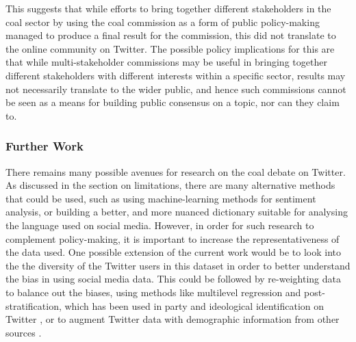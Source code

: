 \documentclass[12pt,onecolumn,twoside]{layout}
\begin{document}
This suggests that while efforts to bring together different stakeholders in the coal sector by using the coal commission as a form of public policy-making managed to produce a final result for the commission, this did not translate to the online community on Twitter. The possible policy implications for this are that while multi-stakeholder commissions may be useful in bringing together different stakeholders with different interests within a specific sector, results may not necessarily translate to the wider public, and hence such commissions cannot be seen as a means for building public consensus on a topic, nor can they claim to.

\subsubsection*{Further Work}
There remains many possible avenues for research on the coal debate on Twitter. As discussed in the section on limitations, there are many alternative methods that could be used, such as using machine-learning methods for sentiment analysis, or building a better, and more nuanced dictionary suitable for analysing the language used on social media. However, in order for such research to complement policy-making, it is important to increase the representativeness of the data used. One possible extension of the current work would be to look into the the diversity of the Twitter users in this dataset in order to better understand the bias in using social media data. This could be followed by re-weighting data to balance out the biases, using methods like multilevel regression and post-stratification, which has been used in party and ideological identification on Twitter \citep{Barbera2015}, or to augment Twitter data with demographic information from other sources \citep{Barbera2015a, Bode2016}.
\end{document}
